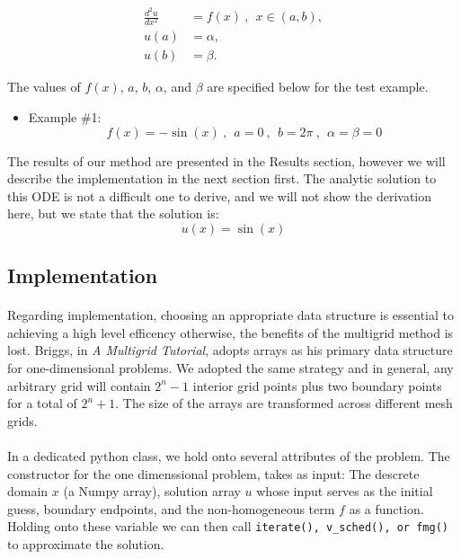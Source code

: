 \documentclass[pdftex,12pt,a4paper]{article}
\begin{document}
    \begin{equation}
    \begin{aligned}
        \frac{d^2u}{dx^2} &= f(x) ~ , ~~ x \in (a, b), \\
        u(a) &= \alpha, \\
        u(b) &= \beta.
    \end{aligned}
    \end{equation}
    
    The values of $f(x)$, $a$, $b$, $\alpha$, and $\beta$ are specified below for the test example. \\
    \begin{itemize}
        \item Example \#1: 
            \begin{equation*}
                f(x) = -\sin(x) ~ , ~~ a = 0 ~ , ~~ b = 2 \pi ~ , ~~ \alpha = \beta = 0
            \end{equation*}

    \end{itemize}
    The results of our method are presented in the Results section, however we will describe the implementation in the next section first. The analytic solution to this ODE is not a difficult one to derive, and we will not show the derivation here, but we state that the solution is: $$ u(x) = \sin(x) $$

    \subsection{Implementation}   

        \paragraph*{} Regarding implementation, choosing an appropriate data structure is essential to achieving a high level efficency otherwise, the benefits of the multigrid method is lost.  Briggs, in \textit{A Multigrid Tutorial}, adopts arrays as his primary data structure for one-dimensional problems.  We adopted the same strategy and in general, any arbitrary grid will contain $2^{n}-1$ interior grid points plus two boundary points for a total of $2^{n}+1$.  The size of the arrays are transformed across different mesh grids. 

        \paragraph*{} In a dedicated python class, we hold onto several attributes of the problem. The constructor for the one dimenssional problem, takes as input: The descrete domain $x$ (a Numpy array), solution array $u$ whose input serves as the initial guess, boundary endpoints, and the non-homogeneous term $f$ as a function. Holding onto these variable we can then call \lstinline{iterate(), v_sched(), or fmg()} to approximate the solution.
\end{document}
